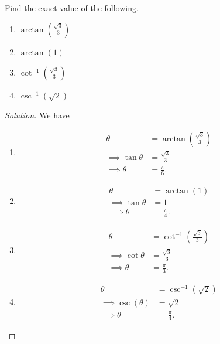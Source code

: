 \documentclass[compacto,10pt,comentarios]{aleph-notas}
\begin{document}
\begin{ejer}
    Find the exact value of the following.
    \begin{enumerate}
        \item $\arctan\left( \frac{\sqrt{3}}{3} \right)$
        \item $\arctan(1)$
        \item $\cot^{-1}\left( \frac{\sqrt{3}}{3} \right)$
        \item $\csc^{-1} \left( \sqrt{2} \right)$
    \end{enumerate}
\end{ejer}
\begin{proof}[Solution]
    We have
    \begin{enumerate}
        \item 
        \begin{align*}
            \theta & = \arctan \left( \frac{\sqrt{3}}{3} \right) \\
            \implies \tan{\theta} & = \frac{\sqrt{3}}{3} \\
            \implies \theta & = \frac{\pi}{6} .
        \end{align*}
        \item 
        \begin{align*}
            \theta & = \arctan \left( 1 \right) \\
            \implies \tan{\theta} & = 1 \\
            \implies \theta & = \frac{\pi}{4} .
        \end{align*}
        \item 
        \begin{align*}
            \theta & = \cot^{-1} \left( \frac{\sqrt{3}}{3} \right) \\
            \implies \cot{\theta} & = \frac{\sqrt{3}}{3} \\
            \implies \theta & = \frac{\pi}{3} .
        \end{align*}
        \item 
        \begin{align*}
            \theta & = \csc^{-1} \left( \sqrt{2} \right) \\
            \implies \csc(\theta) & = \sqrt{2} \\
            \implies \theta & = \frac{\pi}{4} .
        \end{align*}
    \end{enumerate}
\end{proof}
\end{document}
